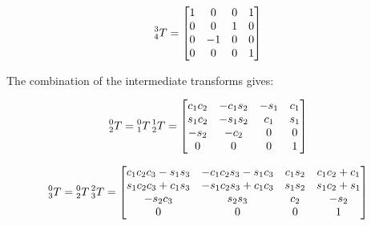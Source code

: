 \documentclass{exam}
\begin{document}
\begin{questions}
\begin{parts}
\begin{equation}
  \prescript{3}{4}T = \begin{bmatrix}
    1 & 0  & 0 & 1 \\
    0 & 0  & 1 & 0 \\
    0 & -1 & 0 & 0 \\
    0 & 0  & 0 & 1 \\
                     \end{bmatrix}
\end{equation}

The combination of the intermediate transforms gives:

\begin{equation}
  \prescript{0}{2}T = \prescript{0}{1}T\prescript{1}{2}T = \begin{bmatrix}
    c_{1}c_{2} & -c_{1}s_{2} & -s_{1} & c_{1} \\
    s_{1}c_{2} & -s_{1}s_{2} & c_{1}  & s_{1} \\
    -s_{2}     & -c_{2}      & 0      & 0     \\
    0          & 0           & 0      & 1     \\
                                                          \end{bmatrix}
\end{equation}

\begin{equation}
  \prescript{0}{3}T = \prescript{0}{2}T\prescript{2}{3}T = \begin{bmatrix}
    c_{1}c_{2}c_{3}-s_{1}s_{3} & -c_{1}c_{2}s_{3}-s_{1}c_{3} & c_{1}s_{2} & c_{1}c_{2}+c_{1} \\
    s_{1}c_{2}c_{3}+c_{1}s_{3} & -s_{1}c_{2}s_{3}+c_{1}c_{3} & s_{1}s_{2} & s_{1}c_{2}+s_{1} \\
    -s_{2}c_{3}                & s_{2}s_{3}                  & c_{2}      & -s_{2}           \\
    0                          & 0                           & 0          & 1                \\
                                                          \end{bmatrix}
\end{equation}


\end{parts}
\end{questions}
\end{document}
